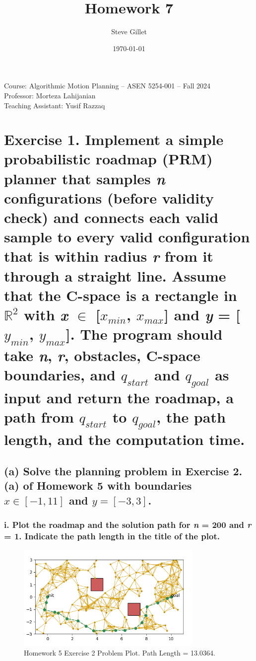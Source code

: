 \documentclass{article}
\title{Homework 7}
\author{Steve Gillet}
\date{\today}
\newcommand{\className}{Course: Algorithmic Motion Planning – ASEN 5254-001 – Fall 2024}
\newcommand{\professorName}{Professor: Morteza Lahijanian}
\newcommand{\taName}{Teaching Assistant: Yusif Razzaq}
\begin{document}
\maketitle
\begin{center}
    \large{\className} \\
    \large{\professorName} \\
    \large{\taName}
\end{center}

\section*{Exercise 1.
Implement a simple probabilistic roadmap (PRM) planner that samples \textit{n} configurations 
(before validity check) and connects each valid sample to every valid configuration that is within 
radius \textit{r} from it through a straight line. Assume that the C-space is a rectangle in $\mathbb{R}^2$ 
with \textit{x} $\in$ [$\mathit{x}_{min}$, $\mathit{x}_{max}$] and \textit{y} = [$\mathit{y}_{min}$, $\mathit{y}_{max}$]. 
The program should take \textit{n}, \textit{r}, obstacles, C-space boundaries, and $q_{start}$ and $q_{goal}$ 
as input and return the roadmap, a path from $q_{start}$ to $q_{goal}$, the path length, and the computation time.
}

\subsection*{(a) Solve the planning problem in \textbf{Exercise 2.(a)} of \textbf{Homework 5} with boundaries $\mathit{x} \in [-1, 11]$ and $\mathit{y} = [-3,3]$.}

\subsubsection*{i. Plot the roadmap and the solution path for \textit{n} = 200 and \textit{r} = 1. Indicate the path length in the title of the plot.}

\begin{figure}[h]
    \centering
    \includegraphics[width=0.8\textwidth]{hw5prmPlot.png}
    \caption{Homework 5 Exercise 2 Problem Plot. Path Length = 13.0364.}
    \label{fig:hw5prmPlot}
\end{figure}
\end{document}
